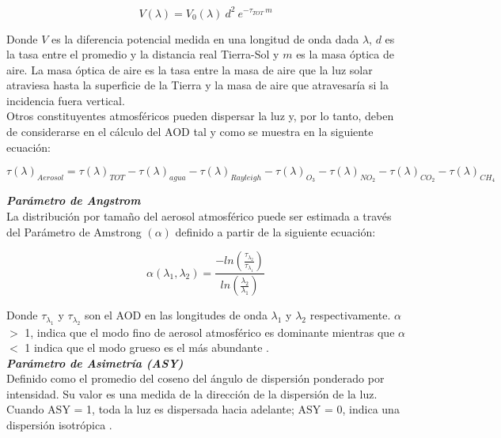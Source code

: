 \begin{equation}
V(\lambda) = V_0(\lambda)\:d^{2} \:e^{-\tau_{TOT}\: m}
\end{equation}

Donde $V$ es la diferencia potencial medida en una longitud de onda dada $\lambda$, $d$ es la tasa entre el promedio y la distancia real Tierra-Sol y $m$ es la masa óptica de aire. La masa óptica de aire es la tasa entre la masa de aire que la luz solar atraviesa hasta la superficie de la Tierra y la masa de aire que atravesaría si la incidencia fuera vertical.\\

Otros constituyentes atmosféricos pueden dispersar la luz y, por lo tanto, deben de considerarse en el cálculo del AOD \citep{Holben1998} tal y como se muestra en la siguiente ecuación:

\begin{equation}
\tau (\lambda)_{Aerosol} = \tau (\lambda)_{TOT} - \tau (\lambda)_{agua} - \tau (\lambda)_{Rayleigh} - \tau (\lambda)_{O_3} - \tau (\lambda)_{NO_2} - \tau (\lambda)_{CO_2} - \tau (\lambda)_{CH_4}
\end{equation}

\newpage

\textit{\textbf{Parámetro de Angstrom}}\\

La distribución por tamaño del aerosol atmosférico puede ser estimada a través del Parámetro de Amstrong $(\alpha)$ \citep{Holben1998} definido a partir de la siguiente ecuación:

\begin{equation}
\alpha (\lambda_1, \lambda_2) = \frac { -ln (\frac{\tau_\lambda_2}{\tau_\lambda_1})}{ ln(\frac{\lambda_2}{\lambda_1})}
\end{equation}

Donde $\tau_\lambda_1$ y $\tau_\lambda_2$ son el AOD en las longitudes de onda $\lambda_1$ y $\lambda_2$ respectivamente. $\alpha$ $>$ 1, indica que el modo fino de aerosol atmosférico es dominante mientras que  $\alpha$ $<$ 1 indica que el modo grueso es el más abundante \citep{Carabali2017}.\\

\textit{\textbf{Parámetro de Asimetría (ASY)}}\\

Definido como el promedio del coseno del ángulo de dispersión ponderado por intensidad. Su valor es una medida de la dirección de la dispersión de la luz. Cuando ASY = 1, toda la luz es dispersada hacia adelante; ASY = 0, indica una dispersión isotrópica \citep{Solano2015}.\\


